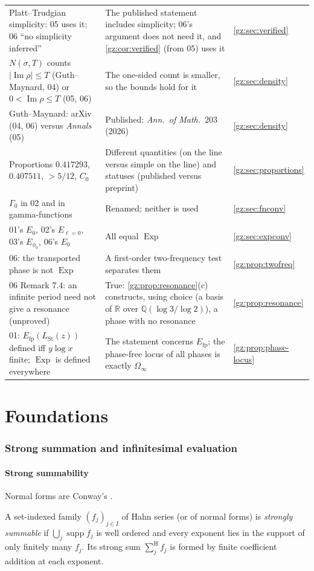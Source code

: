 \documentclass[11pt,a4paper]{article}
\numberwithin{equation}{section}
\theoremstyle{definition}
\theoremstyle{remark}
\newcommand{\R}{\mathbb R}
\newcommand{\Q}{\mathbb Q}
\renewcommand{\Im}{\operatorname{Im}}
\newcommand{\supp}{\operatorname{supp}}
\newcommand{\Exp}{\operatorname{Exp}}
\newcommand{\Efp}{E_{\mathrm{fp}}}
\newcommand{\Sh}{\mathop{\textstyle\sum}\nolimits^{\mathrm H}}
\newcommand{\LSt}{L_{\mathrm{St}}}
\newcommand{\Om}{\Omega_{\infty}}
\newcommand{\src}[1]{\textup{[#1]}}
\begin{document}
\begin{center}
\begin{longtable}{@{}P{0.30\textwidth}P{0.44\textwidth}P{0.18\textwidth}@{}}
Platt--Trudgian simplicity: 05 uses it; 06 ``no simplicity inferred'' & The published statement includes simplicity; 06's argument does not need it, and \cref{gz:cor:verified} (from 05) uses it & \cref{gz:sec:verified}\\
$N(\sigma,T)$ counts $|\Im\rho|\le T$ (Guth--Maynard, 04) or $0<\Im\rho\le T$ (05, 06) & The one-sided count is smaller, so the bounds hold for it & \cref{gz:sec:density}\\
Guth--Maynard: arXiv (04, 06) versus \emph{Annals} (05) & Published: \emph{Ann.\ of Math.}\ 203 (2026) & \cref{gz:sec:density}\\
Proportions $0.417293$, $0.407511$, $>5/12$, $C_0$ & Different quantities (on the line versus simple on the line) and statuses (published versus preprint) & \cref{gz:sec:proportions}\\
$\Gamma_0$ in 02 and in gamma-functions & Renamed; neither is used & \cref{gz:sec:fnconv}\\
01's $E_0$, 02's $E_{\ell=0}$, 03's $E_{\phi_0}$, 06's $E_0$ & All equal $\Exp$ & \cref{gz:sec:expconv}\\
06: the transported phase is not $\Exp$ & A first-order two-frequency test separates them & \cref{gz:prop:twofreq}\\
06 Remark 7.4: an infinite period need not give a resonance (unproved) & True: \cref{gz:prop:resonance}(c) constructs, using choice (a basis of $\R$ over $\Q(\log3/\log2)$), a phase with no resonance & \cref{gz:prop:resonance}\\
01: $\Efp(\LSt(z))$ defined iff $y\log x$ finite; $\Exp$ is defined everywhere & The statement concerns $\Efp$; the phase-free locus of all phases is exactly $\Om$ & \cref{gz:prop:phase-locus}\\
\bottomrule
\end{longtable}
\end{center}

\part{Foundations}\label{gz:part:foundations}

\section{Strong summation and infinitesimal evaluation}\label{gz:sec:summation}

\subsection{Strong summability}
Normal forms are Conway's \cite{Conway,Gonshor}.
\begin{definition}[Strong summability \src{01--06}]\label{gz:def:strong}
A set-indexed family $(f_j)_{j\in I}$ of Hahn series (or of normal forms) is
\emph{strongly summable} if $\bigcup_j\supp f_j$ is well ordered and every
exponent lies in the support of only finitely many $f_j$. Its strong sum
$\Sh_jf_j$ is formed by finite coefficient addition at each exponent.
\end{definition}
\end{document}
